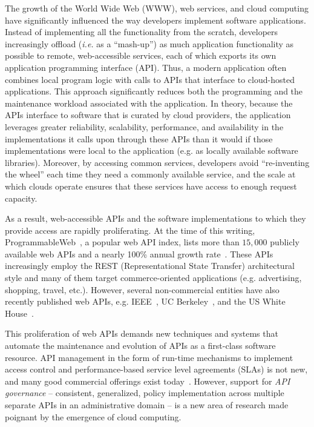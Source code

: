 The growth of the World Wide Web (WWW), web services, and cloud computing have
significantly influenced the way developers implement software applications.
Instead of implementing all the functionality from the scratch, developers
increasingly offload ({\em i.e.} as a ``mash-up'') as much application functionality 
as possible 
to remote,
web-accessible services, each of which exports its own application programming
interface (API).  Thus, a modern application often combines local program logic
with calls to APIs that interface to cloud-hosted applications.
This approach significantly reduces both the programming and
the maintenance workload associated with the application.  In theory, because
the APIs interface to software that is curated by cloud providers, the
application leverages greater
reliability, scalability, performance, 
and availability in the implementations it calls upon through these APIs than
it would if those implementations were local to the application
(e.g. as locally available software libraries).
Moreover, by accessing common services, developers avoid ``re-inventing the
wheel'' each time they need a commonly available service, and the scale at
which clouds operate ensures that these services have access to enough request
capacity.

As a result, web-accessible APIs and the software implementations to which
they provide access are rapidly proliferating.
At the time of this writing, 
ProgrammableWeb~\cite{pweb}, a popular web API index, lists more than $15,000$
publicly available
web APIs and a nearly 100\% annual growth rate~\cite{pweb_growth}.
These APIs increasingly employ the REST (Representational State Transfer) architectural style and 
many of them target commerce-oriented applications (e.g.
advertising, shopping, travel, etc.).
However, several non-commercial entities have also recently
published web 
APIs, e.g. IEEE~\cite{ieeeapis}, UC Berkeley~\cite{ucbapis}, and the US White
House~\cite{whitehouseapis}. 

This proliferation of web APIs demands new techniques and systems that
automate the maintenance and evolution of APIs as a first-class software
resource.  API management in the form of run-time mechanisms to implement
access control and performance-based service level agreements (SLAs) is not
new, and many good commercial offerings exist today~\cite{3scale,apigee,layer7}.   
However, support for \textit{API governance} -- consistent, generalized, policy
implementation across multiple separate APIs in an administrative domain --
is a new area of research made poignant by the emergence of cloud computing.

